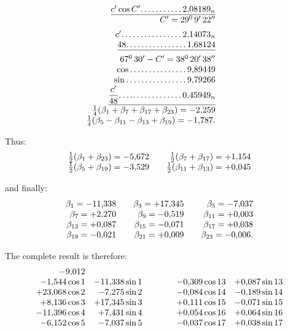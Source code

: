 \begin{landscape}
\[\begin{array}{@{}r@{\qquad}r@{\qquad}r@{}}
\begin{array}[t]{@{}r@{}}
\underline{c'\cos C'\VfourDots{10}2{,}08189_n}\\
C'=29^0\,9'\,22''\\[5pt]
c'\VfourDots{15}2{,}14073_n\\
\underline{48\VfourDots{15}1{,}68124}\\[5pt]
67^0\,30'-C'=38^0\,20'\,38''\\
\cos\VfourDots{14}9{,}89449\\
\sin\VfourDots{15}9{,}79266\\
\underline{\dfrac{c'}{48}\VfourDots{2}\mathord{.}\mkern0.5mu\mathord{.}\,\VfourDots{11}0{,}45949_n}\\[5pt]
\tfrac14(\beta_1+\beta_7+\beta_{17}+\beta_{23})=-2{,}259\\
\tfrac14(\beta_5-\beta_{11}-\beta_{13}+\beta_{19})=-1{,}787.
\end{array}
\end{array}
\]
\par\noindent Thus:
\[
\begin{array}{@{}r@{\qquad}r@{}}
\tfrac12(\beta_1+\beta_{23})=-5{,}672&\tfrac12(\beta_7+\beta_{17})=+1{,}154\\
\tfrac12(\beta_5+\beta_{19})=-3{,}529&\tfrac12(\beta_{11}+\beta_{13})=+0{,}045
\end{array}
\]
\par\noindent and finally:
\[
\begin{array}{@{}r@{\qquad}r@{\qquad}r@{}}
\beta_1=-11{,}338&\beta_3=+17{,}345&\beta_5=-7{,}037\\
\beta_7=+2{,}270&\beta_9=-0{,}519&\beta_{11}=+0{,}003\\
\beta_{13}=+0{,}087&\beta_{15}=-0{,}071&\beta_{17}=+0{,}038\\
\beta_{19}=-0{,}021&\beta_{21}=+0{,}009&\beta_{23}=-0{,}006.
\end{array}
\]
\par\noindent The complete result is therefore:
\[
\begin{array}{@{}r@{\quad}r@{\qquad\qquad}r@{\quad}r@{}}
-9{,}012&&&\\
-1{,}544\cos 1&-11{,}338\sin 1&-0{,}309\cos 13&+0{,}087\sin 13\\
+23{,}068\cos 2&-7{,}275\sin 2&-0{,}084\cos 14&-0{,}189\sin 14\\
+8{,}136\cos 3&+17{,}345\sin 3&+0{,}111\cos 15&-0{,}071\sin 15\\
-11{,}396\cos 4&+7{,}431\sin 4&+0{,}054\cos 16&+0{,}064\sin 16\\
-6{,}152\cos 5&-7{,}037\sin 5&-0{,}037\cos 17&+0{,}038\sin 17\\

\end{array}\]
\end{landscape}
